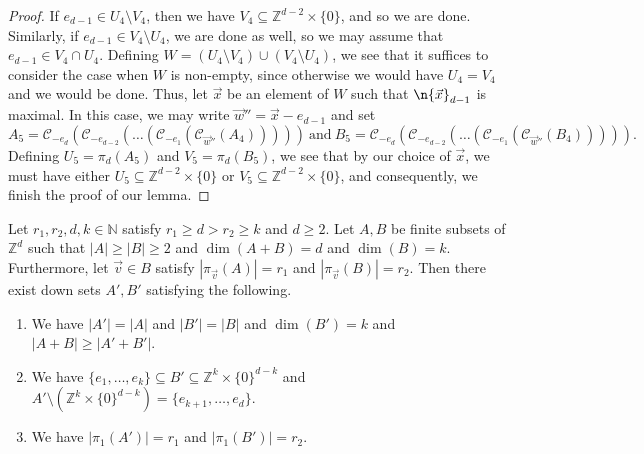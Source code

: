 \begin{proof}
 If $e_{d-1} \in U_4 \setminus V_4$, then we have $V_4 \subseteq \mathbb{Z}^{d-2} \times \{0\}$, and so we are done. Similarly, if $e_{d-1} \in V_4 \setminus U_4$, we are done as well, so we may assume that $e_{d-1} \in V_4 \cap U_4$. Defining $W =  (U_4 \setminus V_4) \cup (V_4 \setminus U_4)$, we see that it suffices to consider the case when $W$ is non-empty, since otherwise we would have $U_4 = V_4$ and we would be done. Thus, let $\vec{x}$ be an element of $W$ such that $\n{\vec{x}}_{d-1}$ is maximal. In this case, we may write
$\vec{w}'' = \vec{x} - e_{d-1}$ and set
\[ A_5 = \mathcal{C}_{-e_d}(\mathcal{C}_{-e_{d-2}} ( \dots (\mathcal{C}_{-e_1}(\mathcal{C}_{\vec{w}''}(A_4))))) \ \text{and} \ B_5 = \mathcal{C}_{-e_d}(\mathcal{C}_{-e_{d-2}} ( \dots (\mathcal{C}_{-e_1}(\mathcal{C}_{\vec{w}''}(B_4))))). \]
Defining $U_5  = \pi_d(A_5)$ and $V_5 = \pi_d(B_5)$, we see that by our choice of $\vec{x}$, we must have either $U_5 \subseteq \mathbb{Z}^{d-2} \times \{0\}$ or $V_5 \subseteq \mathbb{Z}^{d-2} \times \{0\}$, and consequently, we finish the proof of our lemma. 
\end{proof}


\begin{lemma} \label{tmb}
Let $r_1, r_2, d, k \in \mathbb{N}$ satisfy $r_1 \geq d> r_2 \geq k$ and $d \geq 2$. Let $A,B$ be finite subsets of $\mathbb{Z}^d$ such that $|A| \geq |B| \geq 2$ and $\dim(A+B) = d$ and $\dim(B) = k$. Furthermore, let $\vec{v} \in B$ satisfy $|\pi_{\vec{v}}(A)| = r_1$ and $|\pi_{\vec{v}}(B)| = r_2$. Then there exist down sets $A',B'$ satisfying the following. 
\begin{enumerate}
 \item We have $|A'| = |A|$ and $|B'| = |B|$ and $\dim(B') = k$ and $|A+B| \geq |A'+B'|$. 
 \item We have $\{e_1, \dots, e_k\} \subseteq B' \subseteq \mathbb{Z}^k \times \{0\}^{d-k}$ and $A' \setminus (\mathbb{Z}^k \times \{0\}^{d-k}) = \{ e_{k+1}, \dots, e_{d}\}$.
  \item We have $|\pi_{1}(A')| = r_1$ and $|\pi_{1}(B')| = r_2$. 
 \end{enumerate}
\end{lemma}

